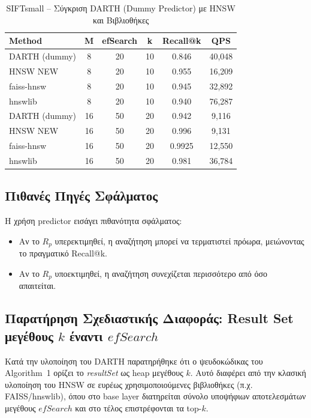 \documentclass[12pt,a4paper]{article}
\begin{document}
\begin{table}[h]
\centering
\caption{SIFTsmall – Σύγκριση DARTH (Dummy Predictor) με HNSW και Βιβλιοθήκες}
\begin{tabular}{|l|c|c|c|c|c|}
\hline
Method & M & efSearch & k & Recall@k & QPS \\
\hline
DARTH (dummy) & 8  & 20  & 10 & 0.846  & 40,048 \\
HNSW NEW      & 8  & 20  & 10 & 0.955  & 16,209 \\
faiss-hnsw    & 8  & 20  & 10 & 0.945  & 32,892 \\
hnswlib       & 8  & 20  & 10 & 0.940  & 76,287 \\
\hline
DARTH (dummy) & 16 & 50  & 20 & 0.942  & 9,116 \\
HNSW NEW      & 16 & 50  & 20 & 0.996  & 9,131 \\
faiss-hnsw    & 16 & 50  & 20 & 0.9925 & 12,550 \\
hnswlib       & 16 & 50  & 20 & 0.981  & 36,784 \\
\hline
\end{tabular}
\end{table}

\subsection{Πιθανές Πηγές Σφάλματος}
Η χρήση predictor εισάγει πιθανότητα σφάλματος:

\begin{itemize}
\item Αν το $R_p$ υπερεκτιμηθεί, η αναζήτηση μπορεί να τερματιστεί πρόωρα, μειώνοντας το πραγματικό Recall@k.
\item Αν το $R_p$ υποεκτιμηθεί, η αναζήτηση συνεχίζεται περισσότερο από όσο απαιτείται.
\end{itemize}


\subsection{Παρατήρηση Σχεδιαστικής Διαφοράς: Result Set μεγέθους $k$ έναντι $efSearch$}

Κατά την υλοποίηση του DARTH παρατηρήθηκε ότι ο ψευδοκώδικας του Algorithm~1 ορίζει το \textit{resultSet} ως heap μεγέθους $k$. 
Αυτό διαφέρει από την κλασική υλοποίηση του HNSW σε ευρέως χρησιμοποιούμενες βιβλιοθήκες (π.χ. FAISS/hnswlib), όπου στο base layer διατηρείται σύνολο υποψήφιων αποτελεσμάτων μεγέθους $efSearch$ και στο τέλος επιστρέφονται τα top-$k$.
\end{document}
